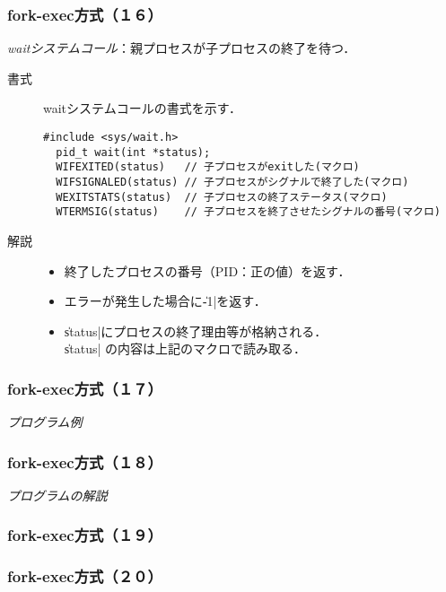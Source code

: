 \documentclass{beamer}                 %
\begin{document}
\begin{frame}[fragile]
  \frametitle{fork-exec方式（１６）}
  \emph{waitシステムコール}：親プロセスが子プロセスの終了を待つ．

  \begin{description}
  \item[書式] waitシステムコールの書式を示す．

\begin{lstlisting}[numbers=none]
  #include <sys/wait.h>
  pid_t wait(int *status);
  WIFEXITED(status)   // 子プロセスがexitした(マクロ)
  WIFSIGNALED(status) // 子プロセスがシグナルで終了した(マクロ)
  WEXITSTATS(status)  // 子プロセスの終了ステータス(マクロ)
  WTERMSIG(status)    // 子プロセスを終了させたシグナルの番号(マクロ)
\end{lstlisting}

  \item[解説] 
    \begin{itemize}
    \item 終了したプロセスの番号（PID：正の値）を返す．
    \item エラーが発生した場合に\|-1|を返す．
    \item \|status|にプロセスの終了理由等が格納される．\\
      \|status| の内容は上記のマクロで読み取る．
    \end{itemize}
  \end{description}
\end{frame}

\begin{frame}[fragile]
  \frametitle{fork-exec方式（１７）}
  \emph{プログラム例}
\end{frame}

\begin{frame}[fragile]
  \frametitle{fork-exec方式（１８）}
  \emph{プログラムの解説}
\end{frame}

\begin{frame}[fragile]
  \frametitle{fork-exec方式（１９）}
\end{frame}

\begin{frame}[fragile]
  \frametitle{fork-exec方式（２０）}
\end{frame}
\end{document}
